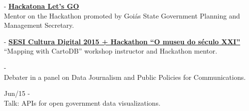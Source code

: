 \documentclass[]{friggeri-cv}
\begin{document}
{\footnotesize{}} -{} \href{https://www.lets.go.gov.br/}{\textbf{Hackatona Let's GO}}\\
           {Mentor on the Hackathon promoted by Goiás State Government Planning and Management Secretary}.

{\footnotesize{}} -{} \href{https://www.hackagenda.com.br/evento/sesi-cultura-digital-2015-hackathon-o-museu-do-seculo-xxi/}{\textbf{SESI Cultura Digital 2015 + Hackathon “O museu do século XXI”}}\\
           {``Mapping with CartoDB'' workshop instructor and Hackathon mentor}.


{\footnotesize{}} -{} \href{https://portaldoaluno.casperlibero.edu.br/agenda-eventos/semana-de-jornalismo-casper-libero-2/}{\textbf{}}\\
           {Debater in a panel on Data Journalism and Public Policies for Communications}.

{\footnotesize{Jun/15}} -{} \href{https://setemasters.imasters.com.br/edicoes/design-de-apis/}{}\\
%
           {Talk: APIs for open government data visualizations}.
\end{document}

